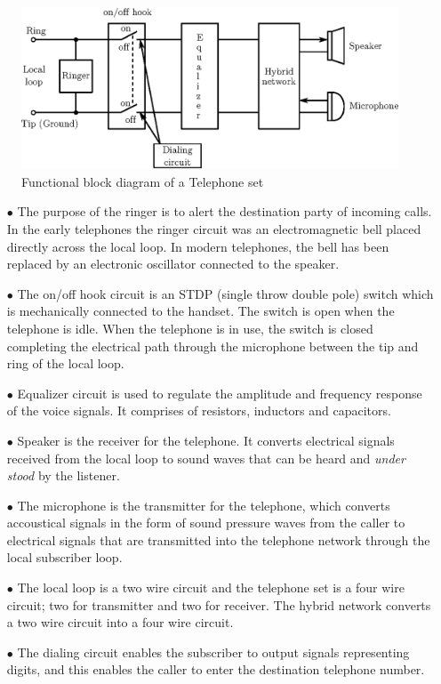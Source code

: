 \begin{figure}[H]
\centering
\includegraphics[scale=.9]{chap10/fig10.2.eps}
\caption{Functional block diagram of a Telephone set}\label{fig10.2}
\end{figure}
\begin{itemize}
\item[$\bullet$]
The purpose of the ringer is to alert the destination party of incoming calls. In the early telephones the ringer circuit was an electromagnetic bell placed directly across the local loop. In modern telephones, the bell has been replaced by an electronic oscillator connected to the speaker.

\item[$\bullet$]
The on/off hook circuit is an STDP (single throw double pole) switch which is mechanically connected to the handset. The switch is open when the telephone is idle. When the telephone is in use, the switch is closed completing the electrical path through the microphone between the tip and ring of the local loop.

\item[$\bullet$]
Equalizer circuit is used to regulate the amplitude and frequency response of the voice signals. It comprises of resistors, inductors and capacitors.

\item[$\bullet$]
Speaker is the receiver for the telephone. It converts electrical signals received from the local loop to sound waves that can be heard and {\em under stood} by the listener. 

\item[$\bullet$]
The microphone is the transmitter for the telephone, which converts accoustical signals in the form of sound pressure waves from the caller to electrical signals that are transmitted into the telephone network through the local subscriber loop.

\item[$\bullet$]
The local loop is a two wire circuit and the telephone set is a four wire circuit; two for transmitter and two for receiver. The hybrid network converts a two wire circuit into a four wire circuit.

\item[$\bullet$]
The dialing circuit enables the subscriber to output signals representing digits, and this enables the caller to enter the destination telephone number.
\end{itemize}

